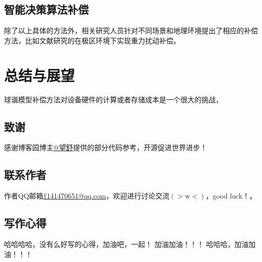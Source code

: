 \documentclass[12pt,a4,utf8]{article}
\begin{document}
\subsection{智能决策算法补偿}

除了以上具体的方法外，相关研究人员针对不同场景和地理环境提出了相应的补偿方法，比如文献\cite{LIQIAN2022}研究的在极区环境下实现重力扰动补偿。
\section{总结与展望}
球谐模型补偿方法对设备硬件的计算或者存储成本是一个很大的挑战，

\newpage
\subsection{致谢}
感谢博客园博主\href{https://www.cnblogs.com/huangliu1111/p/13625826.html}{@望舒}提供的部分代码参考，开源促进世界进步！
\subsection{联系作者}
作者QQ邮箱\href{https://wx.mail.qq.com/?cancel_login=true&from=get_ticket_fail}{1141470651@qq.com}，欢迎进行讨论交流$(>\text{w}<)$，good luck！。

\subsection{写作心得}
哈哈哈哈，没有么好写的心得，加油吧，一起！
加油加油！！！
哈哈哈，加油加油！！！

\end{document}

